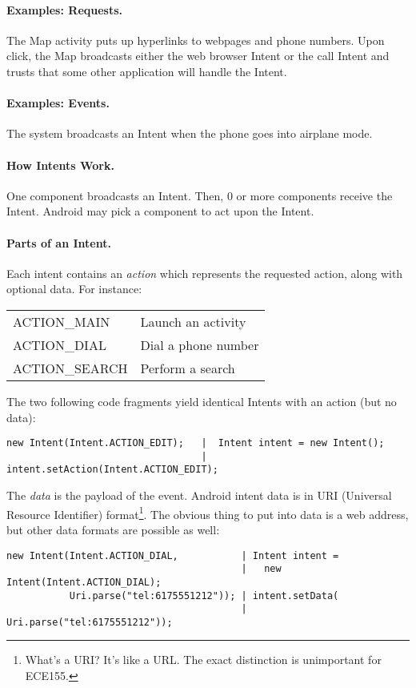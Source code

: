 \paragraph{Examples: Requests.} The Map activity puts up hyperlinks to webpages 
and phone numbers. Upon click, the Map broadcasts either the web browser
Intent or the call Intent and trusts that some other application will
handle the Intent.

\paragraph{Examples: Events.} The system broadcasts an Intent when the phone
goes into airplane mode.

\paragraph{How Intents Work.} One component broadcasts an Intent. Then, 
0 or more components receive the Intent. Android may pick a component
to act upon the Intent.

\paragraph{Parts of an Intent.} Each intent contains an \emph{action} which represents the requested
action, along with optional data. For instance:

\hspace*{2em} \begin{tabular}{ll}
ACTION\_MAIN & Launch an activity \\
ACTION\_DIAL & Dial a phone number \\
ACTION\_SEARCH & Perform a search
\end{tabular}

The two following code fragments yield identical Intents with an action (but no data):
{
\begin{verbatim}
new Intent(Intent.ACTION_EDIT);   |  Intent intent = new Intent();
                                  |  intent.setAction(Intent.ACTION_EDIT);
\end{verbatim}
}

The \emph{data} is the payload of the event. Android intent data is in
URI (Universal Resource Identifier) format\footnote{What's a URI? It's
  like a URL. The exact distinction is unimportant for ECE155.}. The
obvious thing to put into data is a web address, but other data formats
are possible as well:

{
\begin{verbatim}
new Intent(Intent.ACTION_DIAL,           | Intent intent = 
                                         |   new Intent(Intent.ACTION_DIAL);
           Uri.parse("tel:6175551212")); | intent.setData(
                                         |   Uri.parse("tel:6175551212"));
\end{verbatim}
}

